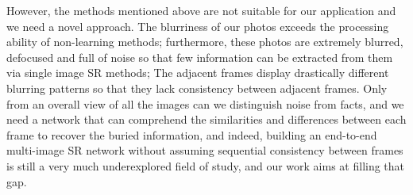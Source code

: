 However, the methods mentioned above are not suitable for our application and we need a novel approach. The blurriness of our photos exceeds the processing ability of non-learning methods; furthermore, these photos are extremely blurred, defocused and full of noise so that few information can be extracted from them via single image SR methods; The adjacent frames display drastically different blurring patterns so that they lack consistency between adjacent frames. Only from an overall view of all the images can we distinguish noise from facts, and we need a network that can comprehend the similarities and differences between each frame to recover the buried information, and indeed, building an end-to-end multi-image SR network without assuming sequential consistency between frames is still a very much underexplored field of study, and our work aims at filling that gap.

